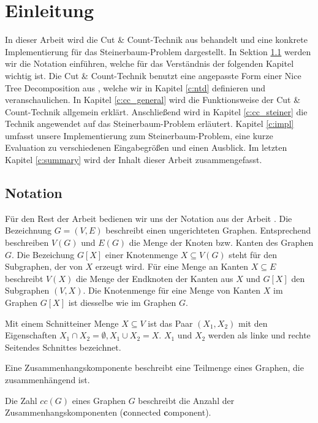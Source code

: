 \chapter{Einleitung}
\label{c:intro} %
In dieser Arbeit wird die Cut \& Count-Technik aus \cite{cygan_solving_2011} behandelt und eine konkrete Implementierung für das Steinerbaum-Problem dargestellt. 
In Sektion \ref{sec:intro_not} werden wir die Notation einführen, welche für das Verständnis der folgenden Kapitel wichtig ist. Die Cut \& Count-Technik benutzt eine angepasste Form einer Nice Tree Decomposition aus \cite{kloks1994}, welche wir in Kapitel \ref{c:ntd} definieren und veranschaulichen.
In Kapitel \ref{c:cc_general} wird die Funktionsweise der Cut \& Count-Technik allgemein erklärt. 
Anschließend wird in Kapitel \ref{c:cc_steiner} die Technik angewendet auf das Steinerbaum-Problem erläutert. 
Kapitel \ref{c:impl} umfasst unsere Implementierung zum Steinerbaum-Problem, eine kurze Evaluation zu verschiedenen Eingabegrößen und einen Ausblick. 
Im letzten Kapitel \ref{c:summary} wird der Inhalt dieser Arbeit zusammengefasst.

\section{Notation}
\label{sec:intro_not}
Für den Rest der Arbeit bedienen wir uns der Notation aus der Arbeit \cite{cygan_solving_2011}. Die Bezeichnung $G=(V,E)$ beschreibt einen ungerichteten Graphen. Entsprechend beschreiben $V(G)$ und $E(G)$ die Menge der Knoten bzw. Kanten des Graphen $G$. Die Bezeichung $G[X]$ einer Knotenmenge $X \subseteq V(G)$ steht für den Subgraphen, der von $X$ erzeugt wird. Für eine Menge an Kanten $X \subseteq E$ beschreibt $V(X)$ die Menge der Endknoten der Kanten aus $X$ und $G[X]$ den Subgraphen $(V,X)$. Die Knotenmenge für eine Menge von Kanten $X$ im Graphen $G[X]$ ist diesselbe wie im Graphen $G$.

Mit einem \glqq Schnitt\grqq einer Menge $X \subseteq V$ ist das Paar $(X_1,X_2)$ mit den Eigenschaften $X_1 \cap X_2 = \emptyset,X_1 \cup X_2 = X$. $X_1$ und $X_2$ werden als linke und rechte \glqq Seiten\grqq des Schnittes bezeichnet. 

Eine Zusammenhangskomponente beschreibt eine Teilmenge eines Graphen, die zusammenhängend ist.

Die Zahl $cc(G)$ eines Graphen $G$ beschreibt die Anzahl der Zusammenhangskomponenten (\glqq \textbf{c}onnected \textbf{c}omponent\grqq).

